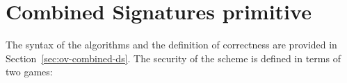 \section{Combined Signatures primitive}
  \label{appendix:combinedsign}
  The syntax of the algorithms and the definition of correctness are provided in
  Section~\ref{sec:ov-combined-ds}. The security of the scheme is defined in
  terms of two games:

